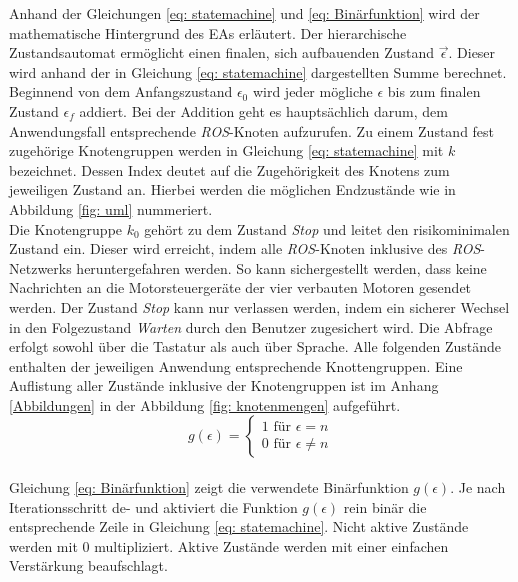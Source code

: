 		Anhand der Gleichungen \ref{eq: statemachine} und \ref{eq: Binärfunktion} wird der mathematische Hintergrund des EAs erläutert. Der hierarchische Zustandsautomat ermöglicht einen finalen, sich aufbauenden Zustand $\vec{\epsilon}$. Dieser wird anhand der in Gleichung \ref{eq: statemachine} dargestellten Summe berechnet. Beginnend von dem Anfangszustand $\epsilon_0$ wird jeder mögliche $\epsilon$ bis zum finalen Zustand $\epsilon_f$ addiert. Bei der Addition geht es hauptsächlich darum, dem Anwendungsfall entsprechende \textit{ROS}-Knoten aufzurufen. Zu einem Zustand fest zugehörige Knotengruppen werden in Gleichung \ref{eq: statemachine} mit $k$ bezeichnet. Dessen Index deutet auf die Zugehörigkeit des Knotens zum jeweiligen Zustand an. Hierbei werden die möglichen Endzustände wie in Abbildung \ref{fig: uml} nummeriert.\\
		
		Die Knotengruppe $k_0$ gehört zu dem Zustand \textit{Stop} und leitet den risikominimalen Zustand ein. Dieser wird erreicht, indem alle \textit{ROS}-Knoten inklusive des \textit{ROS}-Netzwerks heruntergefahren werden. So kann sichergestellt werden, dass keine Nachrichten an die Motorsteuergeräte der vier verbauten Motoren gesendet werden. Der Zustand \textit{Stop} kann nur verlassen werden, indem ein sicherer Wechsel in den Folgezustand \textit{Warten} durch den Benutzer zugesichert wird. Die Abfrage erfolgt sowohl über die Tastatur als auch über Sprache. Alle folgenden Zustände enthalten der jeweiligen Anwendung entsprechende Knottengruppen. Eine Auflistung aller Zustände inklusive der Knotengruppen ist im Anhang \ref{Abbildungen} in der Abbildung \ref{fig: knotenmengen} aufgeführt.\\ 
	
	\begin{equation}
	g(\epsilon)=\left\{\begin{array}{ll} 1 \text{ für } \epsilon=n \\
	0 \text{ für }\epsilon\neq n\end{array}\right. 
	\label{eq: Binärfunktion}
	\end{equation}\\
		
		Gleichung \ref{eq: Binärfunktion} zeigt die verwendete Binärfunktion $g(\epsilon)$. Je nach Iterationsschritt de- und aktiviert die Funktion $g(\epsilon)$ rein binär die entsprechende Zeile in Gleichung \ref{eq: statemachine}. Nicht aktive Zustände werden mit 0 multipliziert. Aktive Zustände werden mit einer einfachen Verstärkung beaufschlagt. \\
		
